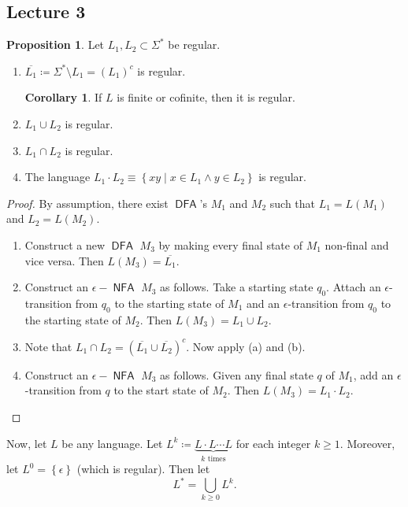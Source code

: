 \documentclass[10pt,letterpaper,cm]{nupset}
\theoremstyle{definition}
\theoremstyle{theorem}
\newtheorem{prop}[definition]{Proposition}
\newtheorem{corollary}[definition]{Corollary}
\theoremstyle{remark}
\newcommand{\1}{\mathbf{1}}
\newcommand{\0}{\vec 0}
\DeclareMathOperator{\DFA}{\mathsf{DFA}}
\DeclareMathOperator{\NFA}{\mathsf{NFA}}
\begin{document}
\subsection{Lecture 3}

\begin{prop} Let $L_1, L_2\subset \Sigma^{\ast}$ be regular. 
\begin{enumerate}[label=(\alph*)]
\item $\overline{L_1}\coloneqq \Sigma^{\ast} \setminus L_1 = \left(L_1\right)^c$ is regular.
\begin{corollary}
If $L$ is finite or cofinite, then it is regular.
\end{corollary}
\item $L_1 \cup L_2$ is regular.
\item $L_1 \cap L_2$ is regular. 
\item The language $L_1\cdot L_2 \equiv  \left\{xy \mid x\in L_1 \land y\in L_2\right\}$ is regular. 
\end{enumerate}
\end{prop} 
\begin{proof} By assumption, there exist $\DFA$'s $M_1$ and $M_2$ such that $L_1 = L(M_1)$ and $L_2 = L(M_2)$.
\begin{enumerate}[label=(\alph*)]
\item Construct a new $\DFA$ $M_3$ by making every final state of $M_1$ non-final and vice versa. Then $L(M_3) = \overline{L_1}$.
\item Construct an $\epsilon{-}\NFA$ $M_3$ as follows. Take a starting state $q_0$. Attach  an $\epsilon$-transition  from $q_0$ to the starting state of $M_1$  and  an $\epsilon$-transition from $q_0$ to the starting state of $M_2$. Then $L(M_3) = L_1 \cup L_2$.
\item Note that $L_1 \cap L_2 = \left(\overline{L_1} \cup \overline{L_2}\right)^c$.  Now apply (a) and (b).
\item Construct an $\epsilon{-}\NFA$ $M_3$ as follows. Given any final state $q$ of $M_1$, add an $\epsilon$-transition from $q$ to the start state of $M_2$. Then $L(M_3) = L_1\cdot L_2$.
\end{enumerate}
\end{proof}

\medskip

Now, let $L$ be any language. Let $L^k \coloneqq \underbrace{L\cdot L \cdots L}_{k \text{ times}}$ for each integer $k\geq 1$. Moreover, let $L^0 = \left\{\epsilon\right\}$ (which is regular). Then let $$L^{\ast} = \bigcup_{k\geq 0} L^k.$$
\end{document}
